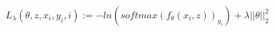 \documentclass[preview]{standalone}
\begin{document}
\begin{align*}
L_\lambda (\theta, z, x_i, y_i, i) := -ln(softmax(f_\theta(x_i, z))_{y_i}) + \lambda ||\theta||_2^2
\end{align*}
\end{document}
